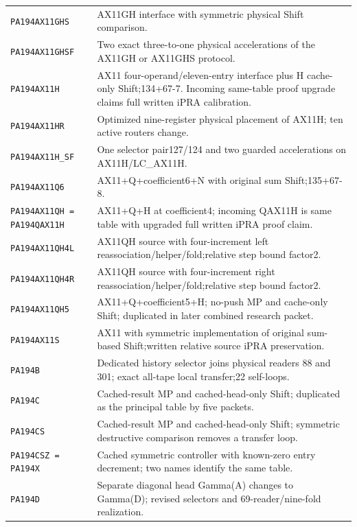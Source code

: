 \begin{longtable}{@{}p{.29\linewidth}p{.65\linewidth}@{}}
\texttt{PA194AX11GHS} & AX11GH interface with symmetric physical Shift comparison.\\[3pt]
\texttt{PA194AX11GHSF} & Two exact three-to-one physical accelerations of the AX11GH or AX11GHS protocol.\\[3pt]
\texttt{PA194AX11H} & AX11 four-operand/eleven-entry interface plus H cache-only Shift;134+67-7. Incoming same-table proof upgrade claims full written iPRA calibration.\\[3pt]
\texttt{PA194AX11HR} & Optimized nine-register physical placement of AX11H; ten active routers change.\\[3pt]
\texttt{PA194AX11H\_\allowbreak SF} & One selector pair127/124 and two guarded accelerations on AX11H/LC\_AX11H.\\[3pt]
\texttt{PA194AX11Q6} & AX11+Q+coefficient6+N with original sum Shift;135+67-8.\\[3pt]
\texttt{PA194AX11QH = PA194QAX11H} & AX11+Q+H at coefficient4; incoming QAX11H is same table with upgraded full written iPRA proof claim.\\[3pt]
\texttt{PA194AX11QH4L} & AX11QH source with four-increment left reassociation/helper/fold;relative step bound factor2.\\[3pt]
\texttt{PA194AX11QH4R} & AX11QH source with four-increment right reassociation/helper/fold;relative step bound factor2.\\[3pt]
\texttt{PA194AX11QH5} & AX11+Q+coefficient5+H; no-push MP and cache-only Shift; duplicated in later combined research packet.\\[3pt]
\texttt{PA194AX11S} & AX11 with symmetric implementation of original sum-based Shift;written relative source iPRA preservation.\\[3pt]
\texttt{PA194B} & Dedicated history selector joins physical readers 88 and 301; exact all-tape local transfer;22 self-loops.\\[3pt]
\texttt{PA194C} & Cached-result MP and cached-head-only Shift; duplicated as the principal table by five packets.\\[3pt]
\texttt{PA194CS} & Cached-result MP and cached-head-only Shift; symmetric destructive comparison removes a transfer loop.\\[3pt]
\texttt{PA194CSZ = PA194X} & Cached symmetric controller with known-zero entry decrement; two names identify the same table.\\[3pt]
\texttt{PA194D} & Separate diagonal head Gamma(A) changes to Gamma(D); revised selectors and 69-reader/nine-fold realization.\\[3pt]

\end{longtable}
